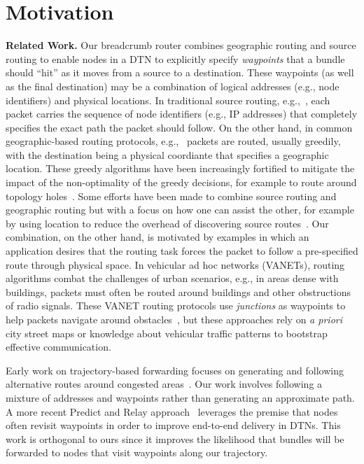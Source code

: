 \section{Motivation}
{\bf Related Work.}
Our {\sc breadcrumb} router combines geographic routing and source routing to enable nodes in a DTN to explicitly specify {\em waypoints} that a bundle should ``hit'' as it moves from a source to a destination. These waypoints (as well as the final destination) may be a combination of logical addresses (e.g., node identifiers) and physical locations. In traditional source routing, e.g.,~\cite{johnson96:dynamic}, each packet carries the sequence of node identifiers (e.g., IP addresses) that completely specifies the exact path the packet should follow. On the other hand, in common geographic-based routing protocols, e.g.,~\cite{florian13:overdrive, karp00:gpsr, navas97:geocast} packets are routed, usually greedily, with the destination being a physical coordiante that specifies a geographic location. These greedy algorithms have been increasingly fortified to mitigate the impact of the non-optimality of the greedy decisions, for example to route around topology holes~\cite{tian03:spatially}. Some efforts have been made to combine source routing and geographic routing but with a focus on how one can assist the other, for example by using location to reduce the overhead of discovering source routes~\cite{basagni99:dynamic}. Our combination, on the other hand, is motivated by examples in which an application desires that the routing task forces the packet to follow a pre-specified route through physical space.  In vehicular ad hoc networks (VANETs), routing algorithms combat the challenges of urban scenarios, e.g., in areas dense with buildings, packets must often be routed around buildings and other obstructions of radio signals. These VANET routing protocols use {\em junctions} as waypoints to help packets navigate around obstacles~\cite{jerbi07:improved, lochert05:geographic}, but these approaches rely on {\em a priori} city street maps or knowledge about vehicular traffic patterns to bootstrap effective communication.

Early work on trajectory-based forwarding focuses on generating and following alternative routes around congested areas~\cite{niculescu03:TBF}. Our work involves following a mixture of addresses and waypoints rather than generating an approximate path. A more recent Predict and Relay approach~\cite{yuan09:PRE} leverages the premise that nodes often revisit waypoints in order to improve end-to-end delivery in DTNs. This work is orthogonal to ours since it improves the likelihood that bundles will be forwarded to nodes that visit waypoints along our trajectory.

